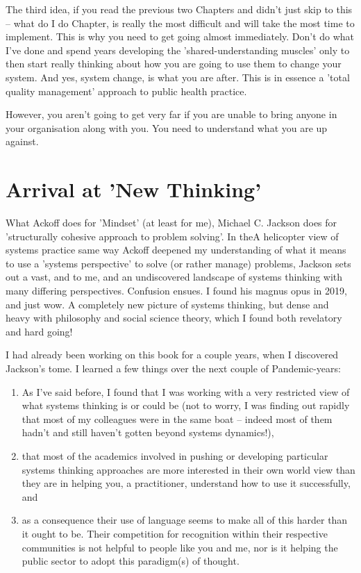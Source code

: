 The third idea, if you read the previous two Chapters and didn't just skip to this -- what do I do Chapter, is really the most difficult and will take the most time to implement. This is why you need to get going almost immediately. Don't do what I've done and spend years developing the 'shared-understanding muscles' only to then start really thinking about how you are going to use them to change your system. And yes, system change, is what you are after. This is in essence a 'total quality management' approach to public health practice.

However, you aren't going to get very far if you are unable to bring anyone in your organisation along with you. You need to understand what you are up against.

\section{Arrival at 'New Thinking'}


What Ackoff does for 'Mindset' (at least for me), Michael C. Jackson does for 'structurally cohesive approach to problem solving'. In theA helicopter view of systems practice same way Ackoff deepened my understanding of what it means to use a 'systems perspective' to solve (or rather manage) problems, Jackson sets out a vast, and to me, and an undiscovered landscape of systems thinking with many differing perspectives. Confusion ensues. I found his magnus opus in 2019, and just wow.\cite{Jackson2019} A completely new picture of systems thinking, but dense and heavy with philosophy and social science theory, which I found both revelatory and hard going!

I had already been working on this book for a couple years, when I discovered Jackson's tome. I learned a few things over the next couple of Pandemic-years: 
\begin{enumerate}
	\item As I've said before, I found that I was working with a very restricted view of what systems thinking is or could be (not to worry, I was finding out rapidly that most of my colleagues were in the same boat -- indeed most of them hadn't and still haven't gotten beyond systems dynamics!),
	\item that most of the academics involved in pushing or developing particular systems thinking approaches are more interested in their own world view than they are in helping you, a practitioner, understand how to use it successfully, and
	\item as a consequence their use of language seems to make all of this harder than it ought to be. Their competition for recognition within their respective communities is not helpful to people like you and me, nor is it helping the public sector to adopt this paradigm(s) of thought.
\end{enumerate}

